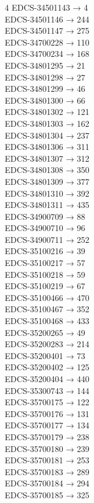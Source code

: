 \begin{multicols}{4}
EDCS-34501143 → 4\\
EDCS-34501146 → 244\\
EDCS-34501147 → 275\\
EDCS-34700228 → 110\\
EDCS-34700234 → 168\\
EDCS-34801295 → 21\\
EDCS-34801298 → 27\\
EDCS-34801299 → 46\\
EDCS-34801300 → 66\\
EDCS-34801302 → 121\\
EDCS-34801303 → 162\\
EDCS-34801304 → 237\\
EDCS-34801306 → 311\\
EDCS-34801307 → 312\\
EDCS-34801308 → 350\\
EDCS-34801309 → 377\\
EDCS-34801310 → 392\\
EDCS-34801311 → 435\\
EDCS-34900709 → 88\\
EDCS-34900710 → 96\\
EDCS-34900711 → 252\\
EDCS-35100216 → 39\\
EDCS-35100217 → 57\\
EDCS-35100218 → 59\\
EDCS-35100219 → 67\\
EDCS-35100466 → 470\\
EDCS-35100467 → 352\\
EDCS-35100468 → 433\\
EDCS-35200265 → 49\\
EDCS-35200283 → 214\\
EDCS-35200401 → 73\\
EDCS-35200402 → 125\\
EDCS-35200404 → 440\\
EDCS-35300743 → 144\\
EDCS-35700175 → 122\\
EDCS-35700176 → 131\\
EDCS-35700177 → 134\\
EDCS-35700179 → 238\\
EDCS-35700180 → 239\\
EDCS-35700181 → 253\\
EDCS-35700183 → 289\\
EDCS-35700184 → 294\\
EDCS-35700185 → 325\\

\end{multicols}
